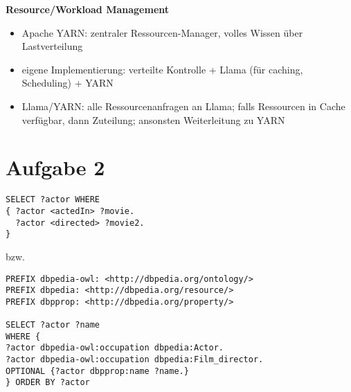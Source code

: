 \documentclass[a4paper]{scrartcl}
\begin{document}
\textbf{Resource/Workload Management}
\begin{itemize}
\item Apache YARN: zentraler Ressourcen-Manager, volles Wissen über Lastverteilung
\item eigene Implementierung: verteilte Kontrolle + Llama (für caching, Scheduling) + YARN
\item Llama/YARN: alle Ressourcenanfragen an Llama; falls Ressourcen in Cache verfügbar, dann Zuteilung; ansonsten Weiterleitung zu YARN
\end{itemize}


\section*{Aufgabe 2}
\begin{verbatim}
SELECT ?actor WHERE
{ ?actor <actedIn> ?movie.
  ?actor <directed> ?movie2.
}
\end{verbatim}
bzw.
\begin{verbatim}
PREFIX dbpedia-owl: <http://dbpedia.org/ontology/>
PREFIX dbpedia: <http://dbpedia.org/resource/>
PREFIX dbpprop: <http://dbpedia.org/property/>

SELECT ?actor ?name
WHERE {
?actor dbpedia-owl:occupation dbpedia:Actor.
?actor dbpedia-owl:occupation dbpedia:Film_director.
OPTIONAL {?actor dbpprop:name ?name.}
} ORDER BY ?actor
\end{verbatim}
\end{document}
